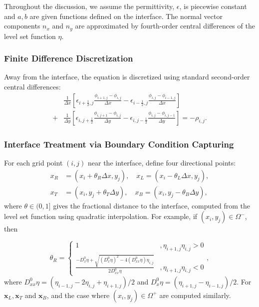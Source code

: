 Throughout the discussion, we assume the permittivity, $\epsilon$, is piecewise constant and $a,b$ are given functions defined on the interface. The normal vector components $n_x$ and $n_y$ are approximated by fourth-order central differences of the level set function $\eta$.

\subsubsection{Finite Difference Discretization}

Away from the interface, the equation is discretized using standard second-order central differences:
\begin{equation}
	\begin{aligned}
		 & \frac{1}{\Delta x}
		\left[
			\epsilon_{i+\frac{1}{2},j} \frac{\phi_{i+1,j} - \phi_{i,j}}{\Delta x}
			-
			\epsilon_{i-\frac{1}{2},j} \frac{\phi_{i,j} - \phi_{i-1,j}}{\Delta x}
		\right]               \\
		+
		 & \frac{1}{\Delta y}
		\left[
			\epsilon_{i,j+\frac{1}{2}} \frac{\phi_{i,j+1} - \phi_{i,j}}{\Delta y}
			-
			\epsilon_{i,j-\frac{1}{2}} \frac{\phi_{i,j} - \phi_{i,j-1}}{\Delta y}
			\right] = -\rho_{i,j}.
	\end{aligned}
\end{equation}

\subsubsection{Interface Treatment via Boundary Condition Capturing}

For each grid point $(i,j)$ near the interface, define four directional points:
\begin{align}
	x_R & = (x_i + \theta_R \Delta x, y_j), \quad
	x_L = (x_i - \theta_L \Delta x, y_j),         \\
	x_T & = (x_i, y_j + \theta_T \Delta y), \quad
	x_B = (x_i, y_j - \theta_B \Delta y),
\end{align}
where $\theta \in (0,1]$ gives the fractional distance to the interface, computed from the level set function using quadratic interpolation. For example, if $(x_i, y_j)\in\Omega^-$, then

\begin{equation}
	\theta_R = \begin{cases}
		1                                                                                   & , \eta_{i+1,j}\eta_{i,j} > 0 \\
		\frac{-D_x^0\eta + \sqrt{(D_x^0\eta)^2 - 4(D_{xx}^0\eta)\eta_{i,j}}}{2D_{xx}^0\eta} & , \eta_{i+1,j}\eta_{i,j} < 0
	\end{cases},
	\label{eq:theta_computation}
\end{equation}
where $D_{xx}^0\eta = (\eta_{i-1,j}-2\eta_{i,j}+\eta_{i+1,j})/2$ and $D_x^0\eta = (\eta_{i+1,j}-\eta_{i-1,j})/2$. For $\mathbf{x}_L, \mathbf{x}_T$ and $\mathbf{x}_B$, and the case where $(x_i, y_j)\in\Omega^+$ are computed similarly.


